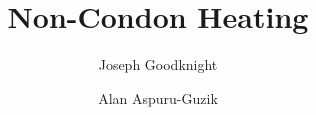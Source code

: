 



\title{Non-Condon Heating}
\author{Joseph Goodknight}
\author{Alan Aspuru-Guzik}
\begin{abstract}
  
\end{abstract}

\maketitle








